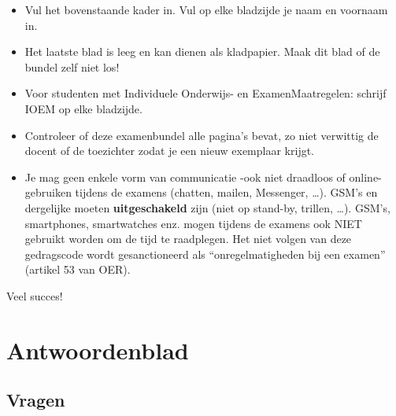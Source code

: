 \documentclass{exam}
\begin{document}
	\begin{itemize}
		\item Vul het bovenstaande kader in. Vul op elke bladzijde je naam en voornaam in.
		\item Het laatste blad is leeg en kan dienen als kladpapier. Maak dit blad of de bundel zelf niet los!
		\item Voor studenten met Individuele Onderwijs- en ExamenMaatregelen: schrijf IOEM op elke bladzijde.
		\item Controleer of deze examenbundel alle pagina’s bevat, zo niet verwittig de docent of de toezichter zodat je een nieuw exemplaar krijgt.
		\item Je mag geen enkele vorm van communicatie  -ook niet draadloos of online- gebruiken tijdens de examens (chatten, mailen, Messenger, \ldots). GSM’s en dergelijke moeten \textbf{uitgeschakeld} zijn (niet op stand-by, trillen, \ldots). GSM’s, smartphones, smartwatches enz. mogen tijdens de examens ook NIET gebruikt worden om de tijd te raadplegen. Het niet volgen van deze gedragscode wordt gesanctioneerd als ``onregelmatigheden bij een examen'' (artikel 53 van OER).
	\end{itemize}
	
	Veel succes!

	
	\newpage
	
	\section{Antwoordenblad}
	
	\newpage
	
	\begin{enumerate}
	
	\section{Vragen}
		
	\end{enumerate}
	
\end{document}
